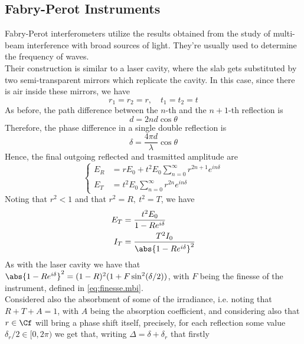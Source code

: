 \documentclass[../electromagnetism.tex]{subfiles}
\begin{document}
\subsection{Fabry-Perot Instruments}
Fabry-Perot interferometers utilize the results obtained from the study of multi-beam interference with broad sources of light. They're usually used to determine the frequency of waves.\\
Their construction is similar to a laser cavity, where the slab gets substituted by two semi-transparent mirrors which replicate the cavity. In this case, since there is air inside these mirrors, we have
\begin{equation*}
	r_1=r_2=r, \quad t_1=t_2=t
\end{equation*}
As before, the path difference between the $n$-th and the $n+1$-th reflection is 
\begin{equation*}
	d=2nd\cos\theta
\end{equation*}
Therefore, the phase difference in a single double reflection is
\begin{equation*}
	\delta=\frac{4\pi d}{\lambda}\cos\theta
\end{equation*}
Hence, the final outgoing reflected and trasmitted amplitude are
\begin{equation}
	\left\{ \begin{aligned}
			E_R&= rE_0+t^2E_0\sum_{n=0}^{\infty}r^{2n+1}e^{in\delta}\\
			E_T&= t^2E_0\sum_{n=0}^{\infty}r^{2n}e^{in\delta}
	\end{aligned}\right.
	\label{eq:eretout.fpi}
\end{equation}
Noting that $r^2<1$ and that $r^2=R, \ t^2=T$, we have
\begin{equation}
	\begin{aligned}
		E_T&= \frac{t^2E_0}{1-Re^{i\delta}}\\
		I_T&= \frac{T^2I_0}{\abs{1-Re^{i\delta}}^2}
	\end{aligned}
	\label{eq:etitout.fpi}
\end{equation}
As with the laser cavity we have that $\abs{1-Re^{i\delta}}^2=(1-R)^2(1+F\sin^2(\delta/2))$, with $F$ being the finesse of the instrument, defined in \eqref{eq:finesse.mbi}.\\
Considered also the absorbment of some of the irradiance, i.e. noting that $R+T+A=1$, with $A$ being the absorption coefficient, and considering also that $r\in\Cf$ will bring a phase shift itself, precisely, for each reflection some value $\delta_r/2\in[0, 2\pi)$ we get that, writing $\Delta=\delta+\delta_r$ that firstly
\end{document}
